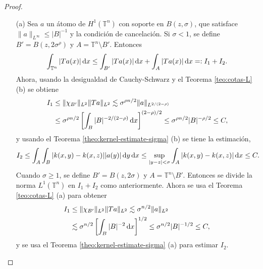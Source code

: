\begin{proof}
	\begin{itemize}
		\item[(a)] Sea $a$ un átomo de $H^1(\mathbb{T}^n)$ con soporte en $B(z, \sigma)$, que satisface $\|a\|_{L^\infty}\leq |B|^{-1}$ y la condición de cancelación. Si $\sigma < 1$, se define $B'=B(z, 2\sigma^\rho)$ y $A = \mathbb{T}^n\setminus B'$. Entonces 
		\begin{equation*}
			\int_{\mathbb{T}^n}|Ta(x)|\mathop{}\!\mathrm{d} x \leq \int_{B'}|Ta(x)|\mathop{}\!\mathrm{d} x  + \int_{A}|Ta(x)|\mathop{}\!\mathrm{d} x =: I_1 + I_2.
		\end{equation*}
		Ahora, usando la desigualdad de Cauchy-Schwarz y el Teorema \ref{teo:cotas-L} (b) se obtiene 
		\begin{align*}
			I_1  &\leq \|\chi_{B'}\|_{L^2}\|Ta\|_{{L^2}}\lesssim \sigma^{\rho n/2}\|a\|_{L^{2/(2-\rho)}} \\ 
			 &\leq  \sigma^{\rho n/2} \left[ \int_B |B|^{-2/(2-\rho)}\mathop{}\!\mathrm{d} x\right]^{(2-\rho)/2} 
			\leq  \sigma^{\rho n/2}|B|^{-\rho/2} \leq C,
		\end{align*}
		y usando el Teorema \ref{theo:kernel-estimate-sigma} (b) se tiene la estimación,
		\begin{equation*}
			I_2 \leq \int_A\int_B |k(x, y) - k(x, z)||a(y)|\mathop{}\!\mathrm{d} y \mathop{}\!\mathrm{d} x \leq \sup_{|y-z|<\sigma}\int_A|k(x,y)-k(x, z)|\mathop{}\!\mathrm{d} x \leq C.
		\end{equation*}
		Cuando $\sigma \geq 1$, se define $B'=B(z, 2\sigma)$ y $A = \mathbb{T}^n\setminus B'$. Entonces se divide la norma $L^1(\mathbb{T}^n)$ en $I_1 + I_2$ como anteriormente. Ahora se usa el Teorema \ref{teo:cotas-L} (a) para obtener
		\begin{align*}
			I_1  &\leq \|\chi_{B'}\|_{L^2}\|Ta\|_{{L^2}}\lesssim\sigma^{ n/2}\|a\|_{L^{2}} \\ 
			 & \lesssim \sigma^{ n/2} \left[ \int_B |B|^{-2}\mathop{}\!\mathrm{d} x\right]^{1/2}  \leq \sigma^{n/2}|B|^{-1/2}\leq C,
		\end{align*}
		y se usa el Teorema \ref{theo:kernel-estimate-sigma} (a) para estimar $I_2$.\\
		

\end{itemize}
\end{proof}
